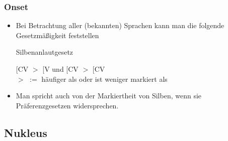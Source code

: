 \begin{frame}
\frametitle{Onset}

\begin{itemize}
	\item Bei Betrachtung aller (bekannten) Sprachen kann man die folgende Gesetzmäßigkeit feststellen \citep[cf.][212f.]{Hall00a}
	
	\begin{block}{Silbenanlautgesetz}
	
	\sub{$\sigma$}[CV $>$ \sub{$\sigma$}[V 
	und
	\sub{$\sigma$}[CV $>$ \sub{$\sigma$}[CV \\
	$>$ $:=$ häufiger als oder ist weniger markiert als 
	
	\end{block}
	 
	 \item Man spricht auch von der Markiertheit von Silben, wenn sie Präferenzgesetzen widersprechen.

\end{itemize}

\end{frame}



\subsection{Nukleus}

